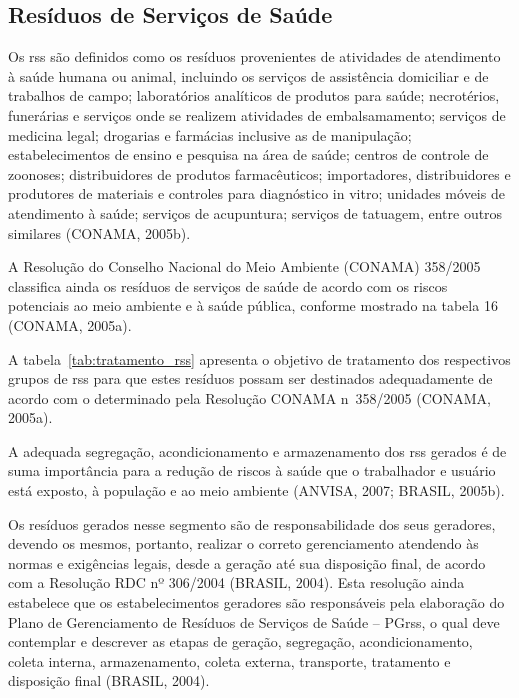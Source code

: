 	
	\subsection{Resíduos de Serviços de Saúde}
	Os \gls{rss} são definidos como os resíduos provenientes de atividades de atendimento à saúde humana ou animal, incluindo os serviços de assistência domiciliar e de trabalhos de campo; laboratórios analíticos de produtos para saúde; necrotérios, funerárias e serviços onde se realizem atividades de embalsamamento; serviços de medicina legal; drogarias e farmácias inclusive as de manipulação; estabelecimentos de ensino e pesquisa na área de saúde; centros de controle de zoonoses; distribuidores de produtos farmacêuticos; importadores, distribuidores e produtores de materiais e controles para diagnóstico in vitro; unidades móveis de atendimento à saúde; serviços de acupuntura; serviços de tatuagem, entre outros similares (CONAMA, 2005b).
	
	A Resolução do Conselho Nacional do Meio Ambiente (CONAMA) 358/2005 classifica ainda os resíduos de serviços de saúde de acordo com os riscos potenciais ao meio ambiente e à saúde pública, conforme mostrado na tabela 16 (CONAMA, 2005a).
	
%	
	
	A tabela~\ref{tab:tratamento_rss} apresenta o objetivo de tratamento dos respectivos grupos de \gls{rss} para que estes resíduos possam ser destinados adequadamente de acordo com o determinado pela Resolução CONAMA n\textdegree\ 358/2005 (CONAMA, 2005a). %
	

	
%	
	
	A adequada segregação, acondicionamento e armazenamento dos \gls{rss} gerados é de suma importância para a redução de riscos à saúde que o trabalhador e usuário está exposto, à população e ao meio ambiente (ANVISA, 2007; BRASIL, 2005b).
	
	Os resíduos gerados nesse segmento são de responsabilidade dos seus geradores, devendo os mesmos, portanto, realizar o correto gerenciamento atendendo às normas e exigências legais, desde a geração até sua disposição final, de acordo com a Resolução RDC nº 306/2004 (BRASIL, 2004). Esta resolução ainda estabelece que os estabelecimentos geradores são responsáveis pela elaboração do Plano de Gerenciamento de Resíduos de Serviços de Saúde – PG\gls{rss}, o qual deve contemplar e descrever as etapas de geração, segregação, acondicionamento, coleta interna, armazenamento, coleta externa, transporte, tratamento e disposição final (BRASIL, 2004).
	
